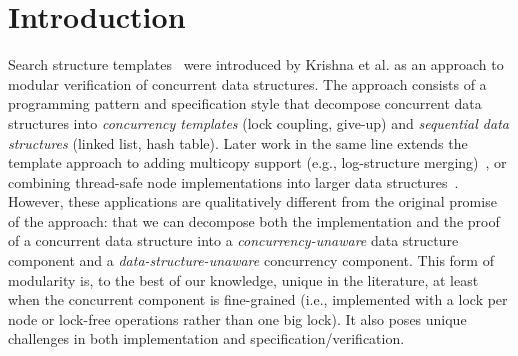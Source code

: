\documentclass[sigplan,screen]{acmart}
\begin{document}
\section{Introduction}
\label{sec:introduction}
Search structure templates~\cite{templates} were introduced by Krishna et al. as an approach to modular verification of concurrent data structures. The approach consists of a programming pattern and specification style that decompose concurrent data structures into \emph{concurrency templates} (lock coupling, give-up) and \emph{sequential data structures} (linked list, hash table). Later work in the same line extends the template approach to adding multicopy support (e.g., log-structure merging)~\cite{}, or combining thread-safe node implementations into larger data structures~\cite{}. However, these applications are qualitatively different from the original promise of the approach: that we can decompose both the implementation and the proof of a concurrent data structure into a \emph{concurrency-unaware} data structure component and a \emph{data-structure-unaware} concurrency component. This form of modularity is, to the best of our knowledge, unique in the literature, at least when the concurrent component is fine-grained (i.e., implemented with a lock per node or lock-free operations rather than one big lock). It also poses unique challenges in both implementation and specification/verification.
\end{document}
